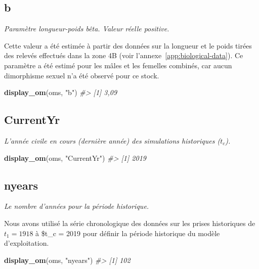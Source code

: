 \documentclass[french,11pt]{book}
\newenvironment{Shaded}{\begin{snugshade}}{\end{snugshade}}
\newcommand{\CommentTok}[1]{\textcolor[rgb]{0.56,0.35,0.01}{\textit{#1}}}
\newcommand{\KeywordTok}[1]{\textcolor[rgb]{0.13,0.29,0.53}{\textbf{#1}}}
\newcommand{\NormalTok}[1]{#1}
\newcommand{\StringTok}[1]{\textcolor[rgb]{0.31,0.60,0.02}{#1}}
\begin{document}
\subsection{b}
\label{app:desc-stock-b-yelloweye}

\emph{Paramètre longueur-poids bêta. Valeur réelle positive.}

Cette valeur a été estimée à partir des données sur la longueur et le poids tirées des relevés effectués dans la zone 4B (voir l'annexe~\ref{app:biological-data}). Ce paramètre a été estimé pour les mâles et les femelles combinés, car aucun dimorphisme sexuel n'a été observé pour ce stock.
\begin{Shaded}
\begin{Highlighting}[]
\KeywordTok{display_om}\NormalTok{(oms, }\StringTok{"b"}\NormalTok{)}
\CommentTok{#> [1] 3,09}
\end{Highlighting}
\end{Shaded}
\label{app:desc-fleet-yelloweye}

\subsection{CurrentYr}
\label{app:desc-fleet-currentyr-yelloweye}

\emph{L'année civile en cours (dernière année) des simulations historiques (\(t_c\)).}
\begin{Shaded}
\begin{Highlighting}[]
\KeywordTok{display_om}\NormalTok{(oms, }\StringTok{"CurrentYr"}\NormalTok{)}
\CommentTok{#> [1] 2019}
\end{Highlighting}
\end{Shaded}
\subsection{nyears}
\label{app:desc-fleet-nyears-yelloweye}

\emph{Le nombre d'années pour la période historique.}

Nous avons utilisé la série chronologique des données sur les prises historiques de \(t_1 = 1918\) à \$t\_c = 2019 pour définir la période historique du modèle d'exploitation.
\begin{Shaded}
\begin{Highlighting}[]
\KeywordTok{display_om}\NormalTok{(oms, }\StringTok{"nyears"}\NormalTok{)}
\CommentTok{#> [1] 102}
\end{Highlighting}
\end{Shaded}
\end{document}

